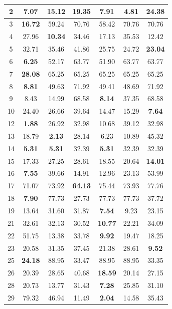 \documentclass[journal,A4paper,compsoc,epsfig]{IEEEtran}
\begin{document}
\begin{table}
\begin{tabular}{|c||c|c|c|c|c|c|}
        2 &7.07 &15.12 &19.35 &7.91 &\textbf{4.81} &24.38 \\ \hline
        3 &\textbf{16.72} &59.24 &70.76 &58.42 &70.76 &70.76 \\ \hline
        4 &27.96 &\textbf{10.34} &34.46 &17.13 &35.53 &12.42 \\ \hline
        5 &32.71 &35.46 &41.86 &25.75 &24.72 &\textbf{23.04} \\ \hline
        6 &\textbf{6.25} &52.17 &63.77 &51.90 &63.77 &63.77 \\ \hline
        7 &\textbf{28.08} &65.25 &65.25 &65.25 &65.25 &65.25 \\ \hline
        8 &\textbf{8.81} &49.63 &71.92 &49.41 &48.69 &71.92 \\ \hline
        9 &8.43 &14.99 &68.58 &\textbf{8.14} &37.35 &68.58 \\ \hline
        10 &24.40 &26.66 &39.64 &14.47 &15.29 &\textbf{7.64} \\ \hline
        12 &\textbf{1.88} &26.92 &32.98 &10.68 &39.12 &32.98 \\ \hline
        13 &18.79 &\textbf{2.13} &28.14 &6.23 &10.89 &45.32 \\ \hline
        14 &\textbf{5.31} &\textbf{5.31} &32.39 &\textbf{5.31} &32.39 &32.39 \\ \hline
        15 &17.33 &27.25 &28.61 &18.55 &20.64 &\textbf{14.01} \\ \hline
        16 &\textbf{7.55} &39.66 &14.91 &12.96 &23.13 &53.99 \\ \hline
        17 &71.07 &73.92 &\textbf{64.13} &75.44 &73.93 &77.76 \\ \hline
        18 &\textbf{7.90} &77.73 &27.73 &77.73 &77.73 &37.72 \\ \hline
        19 &13.64 &31.60 &31.87 &\textbf{7.54} &9.23 &23.15 \\ \hline
        21 &32.61 &32.13 &30.52 &\textbf{10.77} &22.21 &34.09 \\ \hline
        22 &51.75 &13.38 &33.78 &\textbf{9.92} &19.47 &18.25 \\ \hline
        23 &20.58 &31.35 &37.45 &21.38 &28.61 &\textbf{9.52} \\ \hline
        25 &\textbf{24.18} &88.95 &33.47 &88.95 &88.95 &33.35 \\ \hline
        26 &20.39 &28.65 &40.68 &\textbf{18.59} &20.14 &27.15 \\ \hline
        28 &20.73 &13.77 &31.43 &\textbf{7.28} &25.85 &31.10 \\ \hline
        29 &79.32 &46.94 &11.49 &\textbf{2.04} &14.58 &35.43 \\ \hline

\end{tabular}
\end{table}
\end{document}
